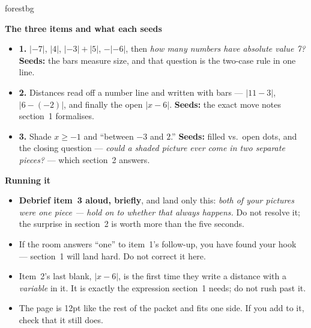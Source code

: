 \documentclass[10pt]{article}
\begin{document}
\boxguard[20]
\begin{skillbox}{forestbg}
\begin{minipage}[t]{0.48\linewidth}
    \textbf{The three items and what each seeds}
    \begin{itemize}
        \item \textbf{1.} $|-7|$, $|4|$, $|-3|+|5|$, $-|-6|$, then \emph{how many numbers have
              absolute value 7?} \textbf{Seeds:} the bars measure size, and that question is the
              two-case rule in one line.
        \item \textbf{2.} Distances read off a number line and written with bars --- $|11-3|$,
              $|6-(-2)|$, and finally the open $|x-6|$. \textbf{Seeds:} the exact move notes
              section~1 formalises.
        \item \textbf{3.} Shade $x\ge-1$ and ``between $-3$ and $2$.'' \textbf{Seeds:} filled vs.\
              open dots, and the closing question --- \emph{could a shaded picture ever come in
              two separate pieces?} --- which section~2 answers.
    \end{itemize}
\end{minipage}
\hfill
\begin{minipage}[t]{0.48\linewidth}
    \textbf{Running it}
    \begin{itemize}
        \item \textbf{Debrief item~3 aloud, briefly}, and land only this: \emph{both of your
              pictures were one piece --- hold on to whether that always happens.} Do not
              resolve it; the surprise in section~2 is worth more than the five seconds.
        \item If the room answers ``one'' to item~1's follow-up, you have found your hook ---
              section~1 will land hard. Do not correct it here.
        \item Item~2's last blank, $|x-6|$, is the first time they write a distance with a
              \emph{variable} in it. It is exactly the expression section~1 needs; do not rush
              past it.
        \item The page is 12pt like the rest of the packet and fits one side. If you add to it,
              check that it still does.
    \end{itemize}
\end{minipage}
\end{skillbox}
\end{document}
